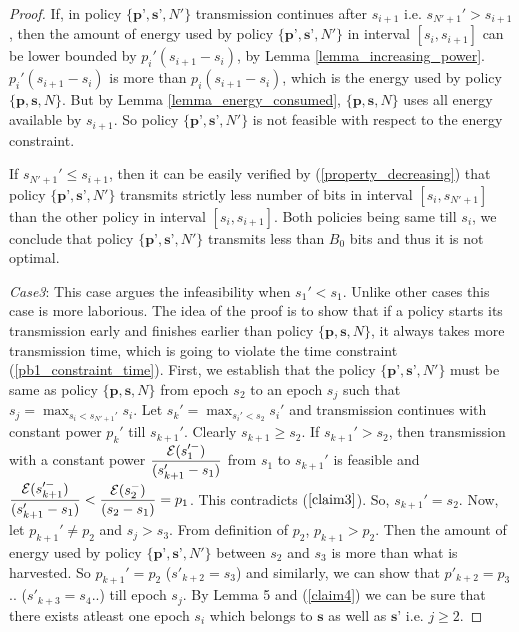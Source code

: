 \begin{proof}
If, in policy $\{\textbf{p'},\textbf{s'},N'\}$ transmission continues after $s_{i+1}$ i.e. $s_{N'+1}'>s_{i+1}$, then the amount of energy used by policy $\{ \textbf{p'},\textbf{s'},N'\}$ in interval $[s_{i},s_{i+1}]$ can be lower bounded by $p_i'(s_{i+1}-s_i)$, by Lemma \ref{lemma_increasing_power}. $p_i'(s_{i+1}-s_i)$ is more than $p_i(s_{i+1}-s_i)$, which is the energy used by policy $\{\textbf{p},\textbf{s},N\}$. But by Lemma \ref{lemma_energy_consumed}, $\{\textbf{p},\textbf{s},N\}$ uses all energy available by $s_{i+1}$. So policy $\{\textbf{p'},\textbf{s'},N'\}$ is not feasible with respect to the energy constraint. 

If $s_{N'+1}'\le s_{i+1}$, then it can be easily verified by (\ref{property_decreasing}) that policy $\{\textbf{p'},\textbf{s'},N'\}$ transmits strictly less number of bits in interval $[s_i,s_{N'+1}]$ than the other policy in interval $[s_{i},s_{i+1}]$. Both policies being same till $s_i$, we conclude that policy $\{\textbf{p'},\textbf{s'},N'\}$ transmits less than $B_0$  bits and thus it is not optimal.

\textit{Case3}: This case argues the infeasibility when $s_1'<s_1$. Unlike other cases this case is more laborious. The idea of the proof is to show that if a policy starts its transmission early and finishes earlier than policy $\{\textbf{p},\textbf{s},N\}$, it always takes more transmission time, which is going to violate the time constraint (\ref{pb1_constraint_time}). First, we establish that the policy $\{\textbf{p'},\textbf{s'},N'\}$ must be same as policy $\{\textbf{p},\textbf{s},N\}$ from epoch $s_2$ to an epoch $s_j$ such that $s_j=\displaystyle\max_{s_i<s_{N'+1}'} s_i$. Let $s_k'=\displaystyle\max_{s_i'<s_2}s_i'$ and transmission continues with constant power $p_k'$ till $s_{k+1}'$. Clearly $s_{k+1}\ge s_2$. If $s_{k+1}'>s_2$, then transmission with a constant power $\dfrac{\mathcal{E}(s_1'^-)}{(s_{k+1}'-s_1)} $ from $s_1$ to $s_{k+1}'$ is feasible and $\dfrac{\mathcal{E}(s_{k+1}'^-)}{(s_{k+1}'-s_1)}<\dfrac{\mathcal{E}(s_2^-)}{(s_2-s_1)}=p_1$. This contradicts ($\ref{claim3}$). So, $s_{k+1}'=s_2$. Now, let $p_{k+1}'\neq p_2$ and $s_j>s_3$. From definition of $p_2$, $p_{k+1}>p_2$. Then the amount of energy used by policy $\{\textbf{p'},\textbf{s'},N'\}$ between $s_2$ and $s_3$ is more than what is harvested. So $p_{k+1}'=p_2$ ($s'_{k+2}=s_3$) and similarly, we can show that $p'_{k+2}=p_3$.. ($ s'_{k+3}=s_4$..) till epoch $s_j$. By Lemma 5 and (\ref{claim4}) we can be sure that there exists atleast one epoch $s_i$ which belongs to $\textbf{s}$ as well as $\textbf{s'}$ i.e. $j\ge 2$.


\end{proof}
